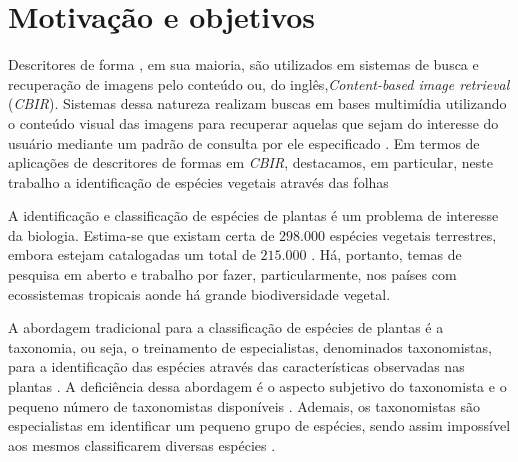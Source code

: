 


\section{Motivação e objetivos \label{sec:motiv_obj}}


Descritores de forma \cite{Belongie:2002, 1467513, Nanni20122254, Hu20123348, Latecki:2007, Wang2012134}, em sua maioria, são utilizados em sistemas de busca e recuperação de imagens pelo conteúdo ou, do inglês,\foreignlanguage{english}{\emph{Content-based image retrieval}} (\emph{CBIR}). Sistemas dessa natureza realizam buscas em bases multimídia utilizando o conteúdo visual das imagens para recuperar aquelas que sejam do interesse do usuário mediante um padrão de consulta por ele especificado \cite{Feng:2003}. Em termos de aplicações de descritores de formas em \emph{CBIR}, destacamos, em particular, neste trabalho a identificação de espécies vegetais através das folhas \cite{deSouza2016,
Fotopoulou:2013,Zhao20153203, Nam2008245, Wang:2000} 

A identificação e classificação de espécies de plantas é um problema de interesse da biologia. Estima-se que existam certa de $298.000$ espécies vegetais terrestres, embora estejam catalogadas um total de $215.000$ \cite{MoraTittensorAdlEtAl2011}. Há, portanto, temas de pesquisa em aberto e trabalho por fazer, particularmente, nos países com ecossistemas tropicais aonde há grande biodiversidade vegetal.

A abordagem tradicional para a classificação de espécies de plantas é a taxonomia, ou seja, o treinamento de especialistas, denominados taxonomistas, para a identificação das espécies através das características observadas nas plantas \cite{Cope20127562}. A deficiência dessa abordagem é o aspecto subjetivo do taxonomista \cite{JVS:JVS1441} e o pequeno número de taxonomistas disponíveis \cite{Cope20127562}. Ademais, os taxonomistas são especialistas em identificar um pequeno grupo de espécies, sendo assim impossível aos mesmos classificarem diversas espécies \cite{Cope20127562}.

